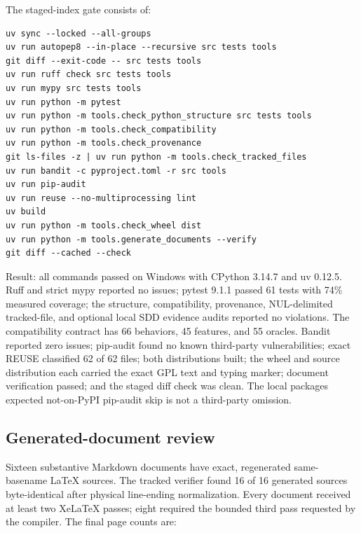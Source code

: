 \documentclass[
  letterpaper,
]{article}
\begin{document}
The staged-index gate consists of:

\begin{lstlisting}
uv sync --locked --all-groups
uv run autopep8 --in-place --recursive src tests tools
git diff --exit-code -- src tests tools
uv run ruff check src tests tools
uv run mypy src tests tools
uv run python -m pytest
uv run python -m tools.check_python_structure src tests tools
uv run python -m tools.check_compatibility
uv run python -m tools.check_provenance
git ls-files -z | uv run python -m tools.check_tracked_files
uv run bandit -c pyproject.toml -r src tools
uv run pip-audit
uv run reuse --no-multiprocessing lint
uv build
uv run python -m tools.check_wheel dist
uv run python -m tools.generate_documents --verify
git diff --cached --check
\end{lstlisting}

Result: all commands passed on Windows with CPython 3.14.7 and uv 0.12.5. Ruff and strict mypy reported no issues;
pytest 9.1.1 passed 61 tests with 74\% measured coverage; the structure, compatibility, provenance, NUL-delimited
tracked-file, and optional local SDD evidence audits reported no violations. The compatibility contract has 66
behaviors, 45 features, and 55 oracles. Bandit reported zero issues; pip-audit found no known third-party
vulnerabilities; exact REUSE classified 62 of 62 files; both distributions built; the wheel and source distribution each
carried the exact GPL text and typing marker; document verification passed; and the staged diff check was clean. The
local package\textquotesingle s expected not-on-PyPI pip-audit skip is not a third-party omission.

\subsection{Generated-document review}\label{generated-document-review}

Sixteen substantive Markdown documents have exact, regenerated same-basename LaTeX sources. The tracked verifier found
16 of 16 generated sources byte-identical after physical line-ending normalization. Every document received at least two
XeLaTeX passes; eight required the bounded third pass requested by the compiler. The final page counts are:
\end{document}
